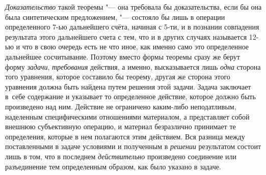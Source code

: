 {\em Доказательство} такой теоремы "--- она требовала бы доказательства, если
бы она была синтетическим предложением, "--- состояло бы лишь в операции
определенного 7-ью дальнейшего счёта, начиная с 5-ти, и в познании
совпадения результата этого дальнейшего счета с тем, что и в других случаях
называется 12-ью и что в свою очередь есть не что иное, как именно само это
определенное дальнейшее сосчитывание. Поэтому вместо формы теоремы сразу же
берут форму {\em задачи}, {\em требования} действия,
а именно, высказывается лишь {\em одна}
сторона того уравнения, которое составило бы теорему, другая
же сторона этого уравнения должна быть найдена путем решения этой задачи.
Задача заключает в~себе содержание и указывает то определенное действие,
которое должно быть произведено над ним. Действие не ограничено каким-либо
неподатливым, наделенным специфическими отношениями материалом, а
представляет собой внешнюю субъективную операцию, и материал безразлично
принимает те определения, которые в нем полагаются этим действием. Вся
разница между поставленными в задаче условиями и полученным в {\em решении}
результатом состоит лишь в том, что в последнем {\em действительно}
произведено соединение или разъединение тем определенным
образом, как было указано в задаче.

